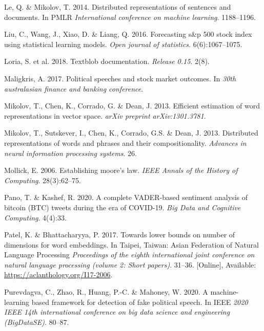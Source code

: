 \documentclass[11pt,preprint, authoryear]{elsarticle}
\numberwithin{equation}{section}
\numberwithin{figure}{section}
\numberwithin{table}{section}
\newlength{\cslhangindent}
\newenvironment{CSLReferences}%
  {\setlength{\parindent}{0pt}%
  \everypar{\setlength{\hangindent}{\cslhangindent}}\ignorespaces}%
  {\par}
\begin{document}
\begin{CSLReferences}
\leavevmode{}%
Le, Q. \& Mikolov, T. 2014. Distributed representations of sentences and
documents. In PMLR \emph{International conference on machine learning}.
1188--1196.

\leavevmode{}%
Liu, C., Wang, J., Xiao, D. \& Liang, Q. 2016. Forecasting s\&p 500
stock index using statistical learning models. \emph{Open journal of
statistics}. 6(6):1067--1075.

\leavevmode{}%
Loria, S. et al. 2018. Textblob documentation. \emph{Release 0.15}.
2(8).

\leavevmode{}%
Maligkris, A. 2017. Political speeches and stock market outcomes. In
\emph{30th australasian finance and banking conference}.

\leavevmode{}%
Mikolov, T., Chen, K., Corrado, G. \& Dean, J. 2013. Efficient
estimation of word representations in vector space. \emph{arXiv preprint
arXiv:1301.3781}.

\leavevmode{}%
Mikolov, T., Sutskever, I., Chen, K., Corrado, G.S. \& Dean, J. 2013.
Distributed representations of words and phrases and their
compositionality. \emph{Advances in neural information processing
systems}. 26.

\leavevmode{}%
Mollick, E. 2006. Establishing moore's law. \emph{IEEE Annals of the
History of Computing}. 28(3):62--75.

\leavevmode{}%
Pano, T. \& Kashef, R. 2020. A complete VADER-based sentiment analysis
of bitcoin (BTC) tweets during the era of COVID-19. \emph{Big Data and
Cognitive Computing}. 4(4):33.

\leavevmode{}%
Patel, K. \& Bhattacharyya, P. 2017. Towards lower bounds on number of
dimensions for word embeddings. In Taipei, Taiwan: Asian Federation of
Natural Language Processing \emph{Proceedings of the eighth
international joint conference on natural language processing (volume 2:
Short papers)}. 31--36. {[}Online{]}, Available:
\url{https://aclanthology.org/I17-2006}.

\leavevmode{}%
Purevdagva, C., Zhao, R., Huang, P.-C. \& Mahoney, W. 2020. A
machine-learning based framework for detection of fake political speech.
In IEEE \emph{2020 IEEE 14th international conference on big data
science and engineering (BigDataSE)}. 80--87.


\end{CSLReferences}
\end{document}
